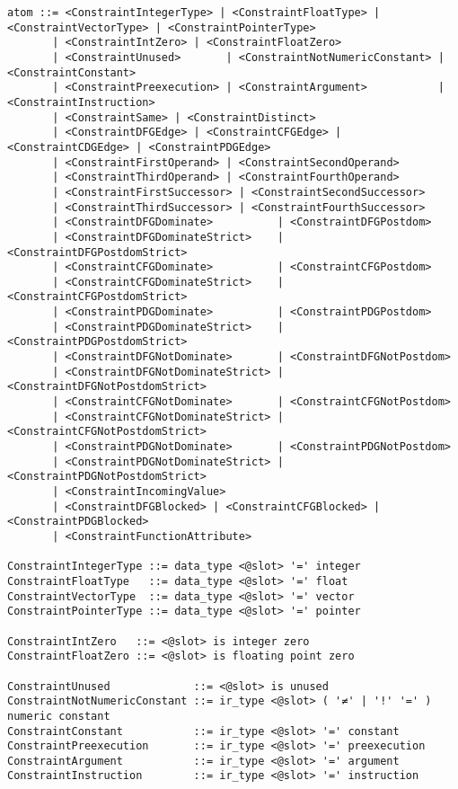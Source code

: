 \begin{lstlisting}[language={},basicstyle=\small\ttfamily,
                   numbers=none,framexleftmargin=0pt,xleftmargin=0pt,]
atom ::= <ConstraintIntegerType> | <ConstraintFloatType> | <ConstraintVectorType> | <ConstraintPointerType>
       | <ConstraintIntZero> | <ConstraintFloatZero>
       | <ConstraintUnused>       | <ConstraintNotNumericConstant> | <ConstraintConstant>
       | <ConstraintPreexecution> | <ConstraintArgument>           | <ConstraintInstruction>
       | <ConstraintSame> | <ConstraintDistinct>
       | <ConstraintDFGEdge> | <ConstraintCFGEdge> | <ConstraintCDGEdge> | <ConstraintPDGEdge>
       | <ConstraintFirstOperand> | <ConstraintSecondOperand>
       | <ConstraintThirdOperand> | <ConstraintFourthOperand>
       | <ConstraintFirstSuccessor> | <ConstraintSecondSuccessor>
       | <ConstraintThirdSuccessor> | <ConstraintFourthSuccessor>
       | <ConstraintDFGDominate>          | <ConstraintDFGPostdom>
       | <ConstraintDFGDominateStrict>    | <ConstraintDFGPostdomStrict>
       | <ConstraintCFGDominate>          | <ConstraintCFGPostdom>
       | <ConstraintCFGDominateStrict>    | <ConstraintCFGPostdomStrict>
       | <ConstraintPDGDominate>          | <ConstraintPDGPostdom>
       | <ConstraintPDGDominateStrict>    | <ConstraintPDGPostdomStrict>
       | <ConstraintDFGNotDominate>       | <ConstraintDFGNotPostdom>
       | <ConstraintDFGNotDominateStrict> | <ConstraintDFGNotPostdomStrict>
       | <ConstraintCFGNotDominate>       | <ConstraintCFGNotPostdom>
       | <ConstraintCFGNotDominateStrict> | <ConstraintCFGNotPostdomStrict>
       | <ConstraintPDGNotDominate>       | <ConstraintPDGNotPostdom>
       | <ConstraintPDGNotDominateStrict> | <ConstraintPDGNotPostdomStrict>
       | <ConstraintIncomingValue>
       | <ConstraintDFGBlocked> | <ConstraintCFGBlocked> | <ConstraintPDGBlocked>
       | <ConstraintFunctionAttribute>

ConstraintIntegerType ::= data_type <@slot> '=' integer
ConstraintFloatType   ::= data_type <@slot> '=' float
ConstraintVectorType  ::= data_type <@slot> '=' vector
ConstraintPointerType ::= data_type <@slot> '=' pointer

ConstraintIntZero   ::= <@slot> is integer zero
ConstraintFloatZero ::= <@slot> is floating point zero

ConstraintUnused             ::= <@slot> is unused
ConstraintNotNumericConstant ::= ir_type <@slot> ( '≠' | '!' '=' ) numeric constant
ConstraintConstant           ::= ir_type <@slot> '=' constant
ConstraintPreexecution       ::= ir_type <@slot> '=' preexecution
ConstraintArgument           ::= ir_type <@slot> '=' argument
ConstraintInstruction        ::= ir_type <@slot> '=' instruction


\end{lstlisting}
